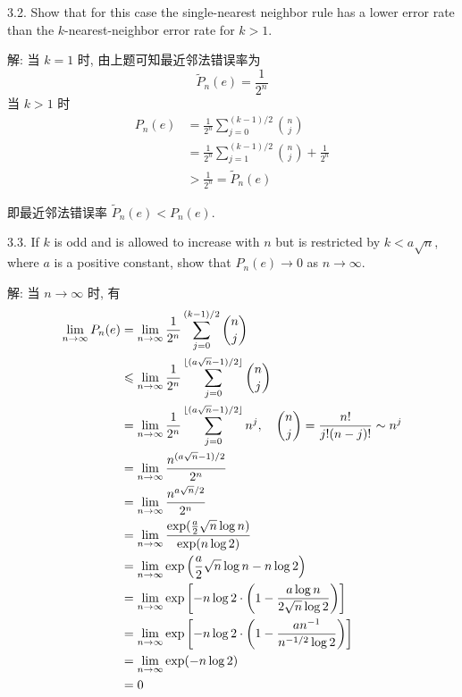\documentclass{article}
\begin{document}
3.2. Show that for this case the single-nearest neighbor rule has a lower error rate than the $k$-nearest-neighbor error rate for $k>1$.

解: 当 $k=1$ 时, 由上题可知最近邻法错误率为
\begin{equation}
  \tilde{P}_n(e)=\frac{1}{2^n}
\end{equation}
当 $k>1$ 时
\begin{equation}
  \begin{aligned}
    P_n(e)
    &=\frac{1}{2^n}\sum_{j=0}^{(k-1)/2}\binom{n}{j}\\
    &=\frac{1}{2^n}\sum_{j=1}^{(k-1)/2}\binom{n}{j}+\frac{1}{2^n}\\
    &>\frac{1}{2^n}=\tilde{P}_n(e)
  \end{aligned}
\end{equation}

即最近邻法错误率 $\tilde{P}_n(e)<P_n(e)$.

3.3. If $k$ is odd and is allowed to increase with $n$ but is restricted by $k < a\sqrt{n}$, where $a$ is a positive constant, show that $P_n(e) \to 0$ as $n \to \infty$.

解: 当 $n\to\infty$ 时, 有
\begin{equation}
  \begin{aligned}
    \lim_{n\to\infty}P_n(e)
    &=\lim_{n\to\infty}\frac{1}{2^n}\sum_{j=0}^{(k-1)/2}\binom{n}{j}\\
    &\leqslant\lim_{n\to\infty}\frac{1}{2^n}\sum_{j=0}^{\lfloor(a\sqrt{n}-1)/2\rfloor}\binom{n}{j}\\
    &=\lim_{n\to\infty}\frac{1}{2^n}\sum_{j=0}^{\lfloor(a\sqrt{n}-1)/2\rfloor}n^j,\quad\binom{n}{j}=\frac{n!}{j!(n-j)!}\sim n^j\\
    &=\lim_{n\to\infty}\frac{n^{(a\sqrt{n}-1)/2}}{2^n}\\
    &=\lim_{n\to\infty}\frac{n^{a\sqrt{n}/2}}{2^n}\\
    &=\lim_{n\to\infty}\frac{\exp(\frac{a}{2}\sqrt{n}\log n)}{\exp(n\log2)}\\
    &=\lim_{n\to\infty}\exp\left(\frac{a}{2}\sqrt{n}\log n-n\log2\right)\\
    &=\lim_{n\to\infty}\exp\left[-n\log2\cdot\left(1-\frac{a\log n}{2\sqrt{n}\log2}\right)\right]\\
    &=\lim_{n\to\infty}\exp\left[-n\log2\cdot\left(1-\frac{an^{-1}}{n^{-1/2}\log2}\right)\right]\\
    &=\lim_{n\to\infty}\exp(-n\log2)\\
    &=0\\
  \end{aligned}
\end{equation}
\end{document}
